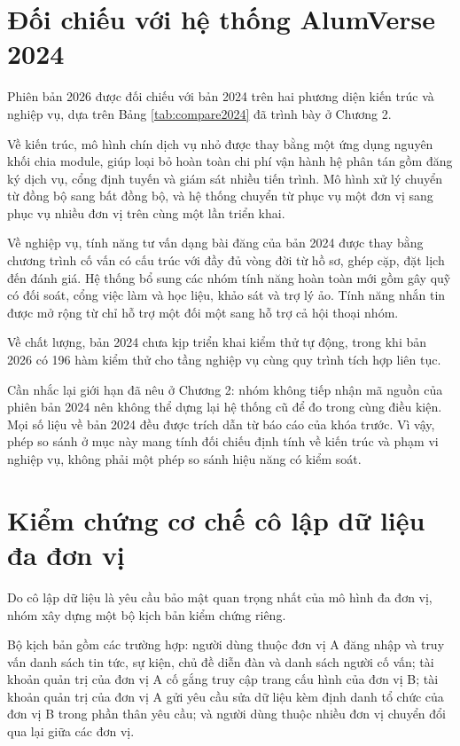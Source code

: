 \documentclass[12pt,a4paper,oneside]{report}
\begin{document}
\section{Đối chiếu với hệ thống AlumVerse 2024}

Phiên bản 2026 được đối chiếu với bản 2024 trên hai phương diện kiến trúc và nghiệp vụ, dựa trên Bảng \ref{tab:compare2024} đã trình bày ở Chương 2.

Về kiến trúc, mô hình chín dịch vụ nhỏ được thay bằng một ứng dụng nguyên khối chia module, giúp loại bỏ hoàn toàn chi phí vận hành hệ phân tán gồm đăng ký dịch vụ, cổng định tuyến và giám sát nhiều tiến trình. Mô hình xử lý chuyển từ đồng bộ sang bất đồng bộ, và hệ thống chuyển từ phục vụ một đơn vị sang phục vụ nhiều đơn vị trên cùng một lần triển khai.

Về nghiệp vụ, tính năng tư vấn dạng bài đăng của bản 2024 được thay bằng chương trình cố vấn có cấu trúc với đầy đủ vòng đời từ hồ sơ, ghép cặp, đặt lịch đến đánh giá. Hệ thống bổ sung các nhóm tính năng hoàn toàn mới gồm gây quỹ có đối soát, cổng việc làm và học liệu, khảo sát và trợ lý ảo. Tính năng nhắn tin được mở rộng từ chỉ hỗ trợ một đối một sang hỗ trợ cả hội thoại nhóm.

Về chất lượng, bản 2024 chưa kịp triển khai kiểm thử tự động, trong khi bản 2026 có 196 hàm kiểm thử cho tầng nghiệp vụ cùng quy trình tích hợp liên tục.

Cần nhắc lại giới hạn đã nêu ở Chương 2: nhóm không tiếp nhận mã nguồn của phiên bản 2024 nên không thể dựng lại hệ thống cũ để đo trong cùng điều kiện. Mọi số liệu về bản 2024 đều được trích dẫn từ báo cáo của khóa trước. Vì vậy, phép so sánh ở mục này mang tính đối chiếu định tính về kiến trúc và phạm vi nghiệp vụ, không phải một phép so sánh hiệu năng có kiểm soát.

\section{Kiểm chứng cơ chế cô lập dữ liệu đa đơn vị}

Do cô lập dữ liệu là yêu cầu bảo mật quan trọng nhất của mô hình đa đơn vị, nhóm xây dựng một bộ kịch bản kiểm chứng riêng.

Bộ kịch bản gồm các trường hợp: người dùng thuộc đơn vị A đăng nhập và truy vấn danh sách tin tức, sự kiện, chủ đề diễn đàn và danh sách người cố vấn; tài khoản quản trị của đơn vị A cố gắng truy cập trang cấu hình của đơn vị B; tài khoản quản trị của đơn vị A gửi yêu cầu sửa dữ liệu kèm định danh tổ chức của đơn vị B trong phần thân yêu cầu; và người dùng thuộc nhiều đơn vị chuyển đổi qua lại giữa các đơn vị.
\end{document}
